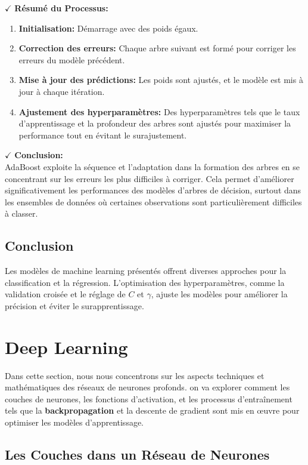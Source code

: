 \textbf{\(\checkmark\)} \textbf{Résumé du Processus:}
\begin{enumerate}
    \item \textbf{Initialisation:} Démarrage avec des poids égaux.
    \item \textbf{Correction des erreurs:} Chaque arbre suivant est formé pour corriger les erreurs du modèle précédent.
    \item \textbf{Mise à jour des prédictions:} Les poids sont ajustés, et le modèle est mis à jour à chaque itération.
    \item \textbf{Ajustement des hyperparamètres:} Des hyperparamètres tels que le taux d’apprentissage et la profondeur des arbres sont ajustés pour maximiser la performance tout en évitant le surajustement.

\end{enumerate}

\textbf{\(\checkmark\)} \textbf{Conclusion:}\\
AdaBoost exploite la séquence et l’adaptation dans la formation des arbres en se concentrant sur les erreurs les plus difficiles à corriger. Cela permet d’améliorer significativement les performances des modèles d’arbres de décision, surtout dans les ensembles de données où certaines observations sont particulièrement difficiles à classer.

\subsection{Conclusion}
Les modèles de machine learning présentés offrent diverses approches pour la classification et la régression. L'optimisation des hyperparamètres, comme la validation croisée et le réglage de \( C \) et \( \gamma \), ajuste les modèles pour améliorer la précision et éviter le surapprentissage.

\section{Deep Learning}

Dans cette section, nous nous concentrons sur les aspects techniques et mathématiques des réseaux de neurones profonds. on va explorer comment les couches de neurones, les fonctions d'activation, et les processus d'entraînement tels que la \textbf{backpropagation} et la descente de gradient sont mis en œuvre pour optimiser les modèles d'apprentissage.

\subsection{Les Couches dans un Réseau de Neurones}

